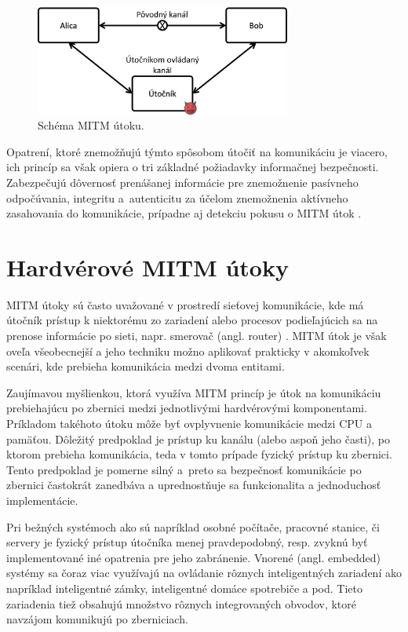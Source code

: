 \begin{figure}
    \centerline{\includegraphics[width=0.75\textwidth]{images/mitm.png}}
    \caption[Schéma MITM útoku]{Schéma MITM útoku.}
    \label{obr:mitm}
\end{figure}

Opatrení, ktoré znemožňujú týmto spôsobom útočiť na komunikáciu je viacero, ich princíp sa však opiera o tri základné požiadavky informačnej bezpečnosti. Zabezpečujú dôvernosť prenášanej informácie pre znemožnenie pasívneho odpočúvania, integritu a~autenticitu za účelom znemožnenia aktívneho zasahovania do komunikácie, prípadne aj detekciu pokusu o MITM útok \cite{mitmTheory}. 

\section{Hardvérové MITM útoky}
MITM útoky sú často uvažované v prostredí sieťovej komunikácie, kde má útočník prístup k niektorému zo zariadení alebo procesov podieľajúcich sa na prenose informácie po sieti, napr. smerovač (angl. router) \cite{mitmTheory}. MITM útok je však oveľa všeobecnejší a jeho techniku možno aplikovať prakticky v akomkoľvek scenári, kde prebieha komunikácia medzi dvoma entitami.

Zaujímavou myšlienkou, ktorá využíva MITM princíp je útok na komunikáciu prebiehajúcu po zbernici medzi jednotlivými hardvérovými komponentami. Príkladom takéhoto útoku môže byť ovplyvnenie komunikácie medzi CPU a pamäťou. Dôležitý predpoklad je prístup ku kanálu (alebo aspoň jeho časti), po ktorom prebieha komunikácia, teda v tomto prípade fyzický prístup ku zbernici. Tento predpoklad je pomerne silný a~preto sa bezpečnosť komunikácie po zbernici častokrát zanedbáva a uprednostňuje sa funkcionalita a jednoduchosť implementácie.

Pri bežných systémoch ako sú napríklad osobné počítače, pracovné stanice, či servery je fyzický prístup útočníka menej pravdepodobný, resp. zvyknú byť implementované iné opatrenia pre jeho zabránenie. Vnorené (angl. embedded) systémy sa čoraz viac využívajú na ovládanie rôznych inteligentných zariadení ako napríklad inteligentné zámky, inteligentné domáce spotrebiče a pod. Tieto zariadenia tiež obsahujú množstvo rôznych integrovaných obvodov, ktoré navzájom komunikujú po zberniciach.

